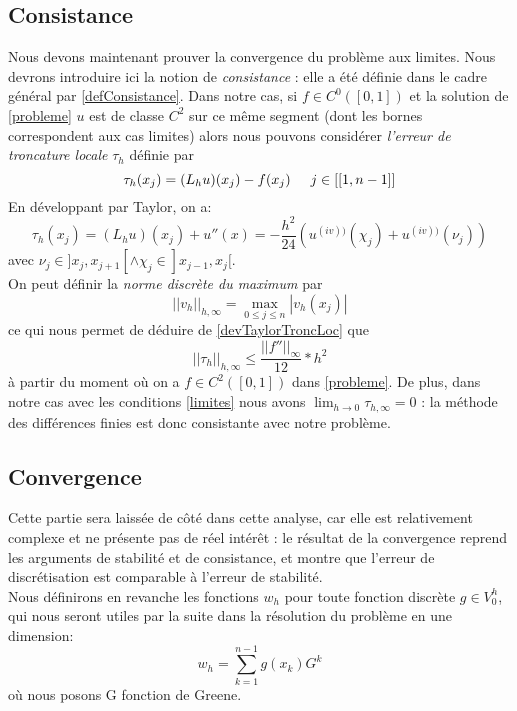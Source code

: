 \documentclass[12pt]{article}
\newcommand{\espace}{\hspace{5mm}}
\begin{document}
\subsection{Consistance}
Nous devons maintenant prouver la convergence du problème aux limites. Nous devrons introduire ici la notion de \emph{consistance} : elle a été définie dans le cadre général par \eqref{defConsistance}. Dans notre cas, si $f \in C^0([0,1])$ et la solution de \eqref{probleme} $u$ est de classe $C^2$ sur ce même segment (dont les bornes correspondent aux cas limites) alors nous pouvons considérer \emph{l'erreur de troncature locale} $\tau_h$ définie par
\begin{equation}\label{erreurTroncatureLocale}
\tau_h(x_j) = (L_h u)(x_j) - f(x_j) \espace j \in [[1,n-1]]
\end{equation}
En développant par Taylor, on a:
\begin{equation}
\tau_h(x_j) = (L_h u)(x_j)  + u''(x) = -\frac{h^2}{24}(u^{(iv))} (\chi_j) + u^{(iv))} (\nu_j))
\end{equation} \label{devTaylorTroncLoc}
avec $\nu_j \in ]x_j, x_{j+1}[ \wedge \chi_j \in ]x_{j-1}, x_j[$.
\\ On peut définir la \emph{norme discrète du maximum} par
\begin{equation} \label{defNormeDiscreteDuMaximum}
|| v_h ||_{h, \infty}  = \max_{0 \le j \le n} |v_h(x_j)|
\end{equation}
ce qui nous permet de déduire de  \eqref{devTaylorTroncLoc} que
\begin{equation}
|| \tau_h ||_{h, \infty} \le \frac{||f''||_\infty}{12} * h^2
\end{equation}
à partir du moment où on a $f \in C^2([0,1])$ dans \eqref{probleme}. De plus, dans notre cas avec les conditions \eqref{limites} nous avons $\lim_{h \rightarrow 0} \tau_{h, \infty} = 0$ : la méthode des différences finies est donc consistante avec notre problème.

\subsection{Convergence}
Cette partie sera laissée de côté dans cette analyse, car elle est relativement complexe et ne présente pas de réel intérêt : le résultat de la convergence reprend les arguments de stabilité et de consistance, et montre que l'erreur de discrétisation est comparable à l'erreur de stabilité.\\
Nous définirons en revanche les fonctions $w_h$ pour toute fonction discrète $g \in V_0^h$, qui nous seront utiles par la suite dans la résolution du problème en une dimension:
\begin{equation} \label{defWK}
w_h = \sum_{k=1}^{n-1} g(x_k) G^k
\end{equation}
où nous posons G fonction de Greene.
\end{document}
